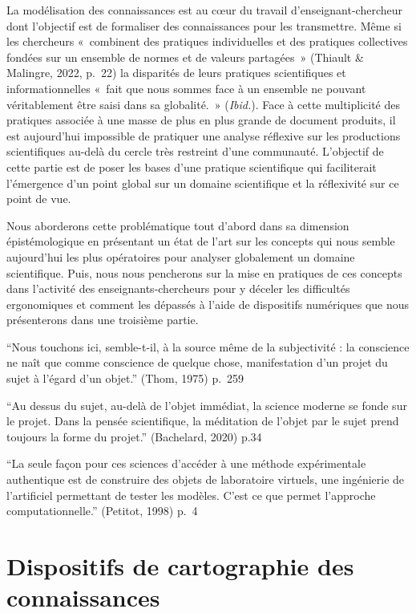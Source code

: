 \documentclass[
  a4paper,
  DIV=11,
  numbers=noendperiod]{scrreprt}
\begin{document}
La modélisation des connaissances est au cœur du travail
d'enseignant-chercheur dont l'objectif est de formaliser des
connaissances pour les transmettre. Même si les chercheurs «~combinent
des pratiques individuelles et des pratiques collectives fondées sur un
ensemble de normes et de valeurs partagées~» (Thiault \& Malingre, 2022,
p.~22) la disparités de leurs pratiques scientifiques et
informationnelles «~fait que nous sommes face à un ensemble ne pouvant
véritablement être saisi dans sa globalité.~» (\emph{Ibid.}). Face à
cette multiplicité des pratiques associée à une masse de plus en plus
grande de document produits, il est aujourd'hui impossible de pratiquer
une analyse réflexive sur les productions scientifiques au-delà du
cercle très restreint d'une communauté. L'objectif de cette partie est
de poser les bases d'une pratique scientifique qui faciliterait
l'émergence d'un point global sur un domaine scientifique et la
réflexivité sur ce point de vue.

Nous aborderons cette problématique tout d'abord dans sa dimension
épistémologique en présentant un état de l'art sur les concepts qui nous
semble aujourd'hui les plus opératoires pour analyser globalement un
domaine scientifique. Puis, nous nous pencherons sur la mise en
pratiques de ces concepts dans l'activité des enseignants-chercheurs
pour y déceler les difficultés ergonomiques et comment les dépassés à
l'aide de dispositifs numériques que nous présenterons dans une
troisième partie.

``Nous touchons ici, semble-t-il, à la source même de la subjectivité :
la conscience ne naît que comme conscience de quelque chose,
manifestation d'un projet du sujet à l'égard d'un objet.'' (Thom, 1975)
p.~259

``Au dessus du sujet, au-delà de l'objet immédiat, la science moderne se
fonde sur le projet. Dans la pensée scientifique, la méditation de
l'objet par le sujet prend toujours la forme du projet.'' (Bachelard,
2020) p.34

``La seule façon pour ces sciences d'accéder à une méthode expérimentale
authentique est de construire des objets de laboratoire virtuels, une
ingénierie de l'artificiel permettant de tester les modèles. C'est ce
que permet l'approche computationnelle.'' (Petitot, 1998) p.~4

\section*{Dispositifs de cartographie des
connaissances}\label{dispositifs-de-cartographie-des-connaissances}
\end{document}
